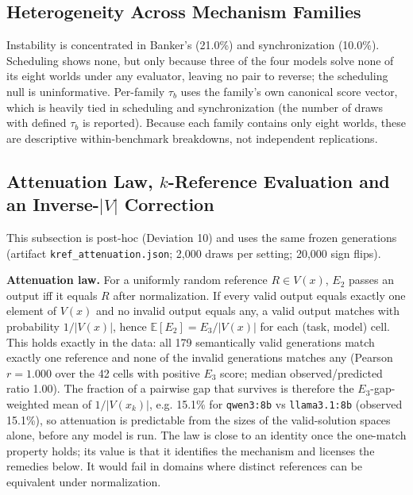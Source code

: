 \documentclass[11pt]{article}
\begin{document}
\subsection{Heterogeneity Across Mechanism Families}
\begin{table}[htbp]
\centering
\footnotesize
\setlength{\tabcolsep}{3pt}
\caption{Reversal by Mechanism Family (50,000 Draws)}
\end{table}
Instability is concentrated in Banker's (21.0\%) and synchronization (10.0\%). Scheduling shows none, but only because three of the four models solve none of its eight worlds under any evaluator, leaving no pair to reverse; the scheduling null is uninformative. Per-family $\tau_b$ uses the family's own canonical score vector, which is heavily tied in scheduling and synchronization (the number of draws with defined $\tau_b$ is reported). Because each family contains only eight worlds, these are descriptive within-benchmark breakdowns, not independent replications.

\subsection{Attenuation Law, $k$-Reference Evaluation and an Inverse-$|V|$ Correction}
This subsection is post-hoc (Deviation 10) and uses the same frozen generations (artifact \texttt{kref\_attenuation.json}; 2,000 draws per setting; 20,000 sign flips).

\textbf{Attenuation law.} For a uniformly random reference $R \in V(x)$, $E_2$ passes an output iff it equals $R$ after normalization. If every valid output equals exactly one element of $V(x)$ and no invalid output equals any, a valid output matches with probability $1/|V(x)|$, hence $\mathbb{E}[E_2] = E_3/|V(x)|$ for each (task, model) cell. This holds exactly in the data: all 179 semantically valid generations match exactly one reference and none of the invalid generations matches any (Pearson $r = 1.000$ over the 42 cells with positive $E_3$ score; median observed/predicted ratio 1.00). The fraction of a pairwise gap that survives is therefore the $E_3$-gap-weighted mean of $1/|V(x_k)|$, e.g. 15.1\% for \texttt{qwen3:8b} vs \texttt{llama3.1:8b} (observed 15.1\%), so attenuation is predictable from the sizes of the valid-solution spaces alone, before any model is run. The law is close to an identity once the one-match property holds; its value is that it identifies the mechanism and licenses the remedies below. It would fail in domains where distinct references can be equivalent under normalization.
\end{document}
